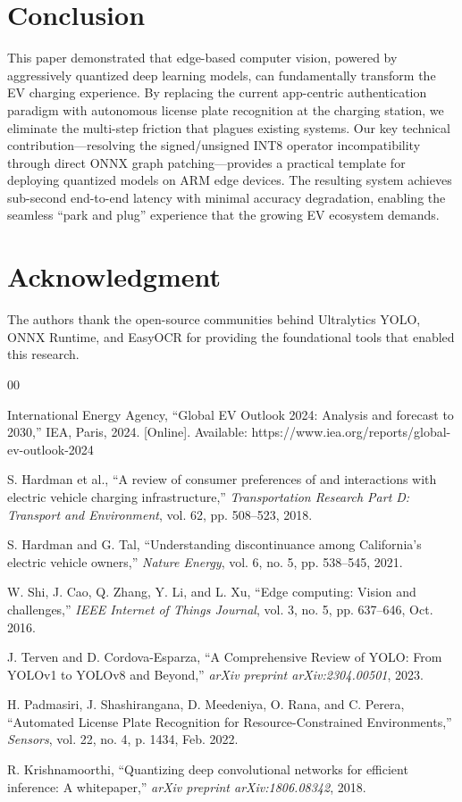 \documentclass[conference]{IEEEtran}
\begin{document}
\section{Conclusion}
This paper demonstrated that edge-based computer vision, powered by aggressively quantized deep learning models, can fundamentally transform the EV charging experience. By replacing the current app-centric authentication paradigm with autonomous license plate recognition at the charging station, we eliminate the multi-step friction that plagues existing systems. Our key technical contribution---resolving the signed/unsigned INT8 operator incompatibility through direct ONNX graph patching---provides a practical template for deploying quantized models on ARM edge devices. The resulting system achieves sub-second end-to-end latency with minimal accuracy degradation, enabling the seamless ``park and plug'' experience that the growing EV ecosystem demands.

\section*{Acknowledgment}
The authors thank the open-source communities behind Ultralytics YOLO, ONNX Runtime, and EasyOCR for providing the foundational tools that enabled this research.

\begin{thebibliography}{00}

 International Energy Agency, ``Global EV Outlook 2024: Analysis and forecast to 2030,'' IEA, Paris, 2024. [Online]. Available: https://www.iea.org/reports/global-ev-outlook-2024

 S. Hardman et al., ``A review of consumer preferences of and interactions with electric vehicle charging infrastructure,'' \textit{Transportation Research Part D: Transport and Environment}, vol. 62, pp. 508--523, 2018.

 S. Hardman and G. Tal, ``Understanding discontinuance among California’s electric vehicle owners,'' \textit{Nature Energy}, vol. 6, no. 5, pp. 538--545, 2021.

 W. Shi, J. Cao, Q. Zhang, Y. Li, and L. Xu, ``Edge computing: Vision and challenges,'' \textit{IEEE Internet of Things Journal}, vol. 3, no. 5, pp. 637--646, Oct. 2016.

 J. Terven and D. Cordova-Esparza, ``A Comprehensive Review of YOLO: From YOLOv1 to YOLOv8 and Beyond,'' \textit{arXiv preprint arXiv:2304.00501}, 2023.

 H. Padmasiri, J. Shashirangana, D. Meedeniya, O. Rana, and C. Perera, ``Automated License Plate Recognition for Resource-Constrained Environments,'' \textit{Sensors}, vol. 22, no. 4, p. 1434, Feb. 2022.

 R. Krishnamoorthi, ``Quantizing deep convolutional networks for efficient inference: A whitepaper,'' \textit{arXiv preprint arXiv:1806.08342}, 2018.

\end{thebibliography}
\end{document}
